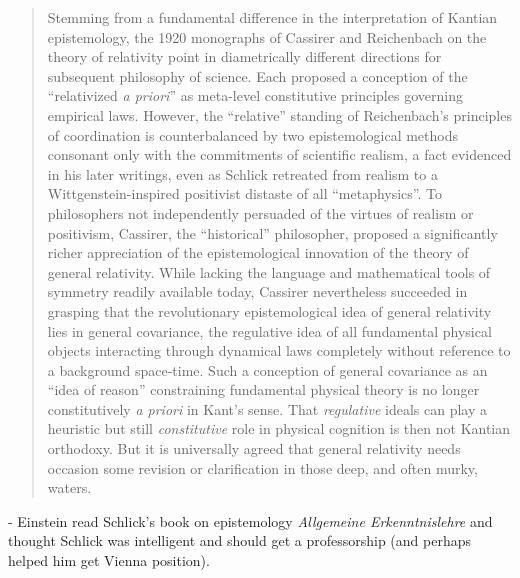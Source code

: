 \begin{quote}
    Stemming from a fundamental difference in the interpretation of Kantian epistemology, the 1920 monographs of Cassirer and Reichenbach on the theory of relativity point in diametrically different directions for subsequent philosophy of science.  Each proposed a conception of the ``relativized \emph{a priori}'' as meta-level constitutive principles governing empirical laws.  However, the ``relative'' standing of Reichenbach's principles of coordination is counterbalanced by two epistemological methods consonant only with the commitments of scientific realism, a fact evidenced in his later writings, even as Schlick retreated from realism to a Wittgenstein-inspired positivist distaste of all ``metaphysics''.  To philosophers not independently persuaded of the virtues of realism or positivism, Cassirer, the ``historical'' philosopher, proposed a significantly richer appreciation of the epistemological innovation of the theory of general relativity.  While lacking the language and mathematical tools of symmetry readily available today, Cassirer nevertheless succeeded in grasping that the revolutionary epistemological idea of general relativity lies in general covariance, the regulative idea of all fundamental physical objects interacting through dynamical laws completely without reference to a background space-time.  Such a conception of general covariance as an ``idea of reason'' constraining fundamental physical theory is no longer constitutively \emph{a priori} in Kant's sense.  That \emph{regulative} ideals can play a heuristic but still \emph{constitutive} role in physical cognition is then not Kantian orthodoxy.  But it is universally agreed that general relativity needs occasion some revision or clarification in those deep, and often murky, waters.
    
    \citep[p. 46]{Ryckman2005}
\end{quote}

- Einstein read Schlick's book on epistemology \emph{Allgemeine Erkenntnislehre} and thought Schlick was intelligent and should get a professorship (and perhaps helped him get Vienna position).  

